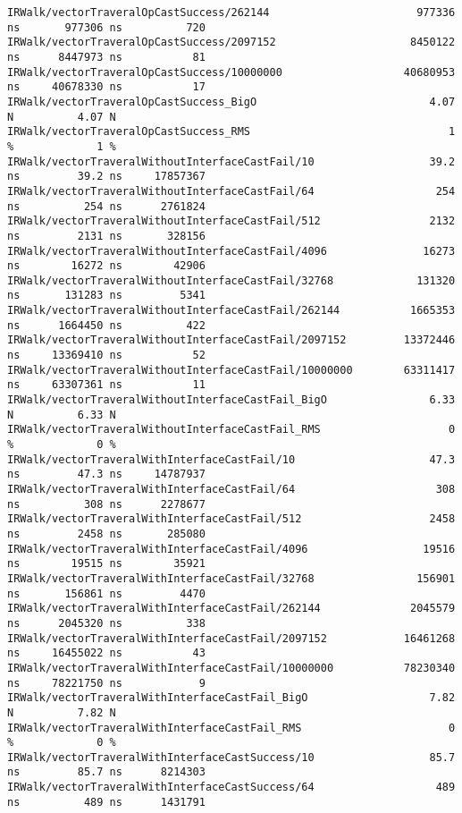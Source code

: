 \begin{code}
\begin{verbatim}
IRWalk/vectorTraveralOpCastSuccess/262144                       977336 ns       977306 ns          720
IRWalk/vectorTraveralOpCastSuccess/2097152                     8450122 ns      8447973 ns           81
IRWalk/vectorTraveralOpCastSuccess/10000000                   40680953 ns     40678330 ns           17
IRWalk/vectorTraveralOpCastSuccess_BigO                           4.07 N          4.07 N
IRWalk/vectorTraveralOpCastSuccess_RMS                               1 %             1 %
IRWalk/vectorTraveralWithoutInterfaceCastFail/10                  39.2 ns         39.2 ns     17857367
IRWalk/vectorTraveralWithoutInterfaceCastFail/64                   254 ns          254 ns      2761824
IRWalk/vectorTraveralWithoutInterfaceCastFail/512                 2132 ns         2131 ns       328156
IRWalk/vectorTraveralWithoutInterfaceCastFail/4096               16273 ns        16272 ns        42906
IRWalk/vectorTraveralWithoutInterfaceCastFail/32768             131320 ns       131283 ns         5341
IRWalk/vectorTraveralWithoutInterfaceCastFail/262144           1665353 ns      1664450 ns          422
IRWalk/vectorTraveralWithoutInterfaceCastFail/2097152         13372446 ns     13369410 ns           52
IRWalk/vectorTraveralWithoutInterfaceCastFail/10000000        63311417 ns     63307361 ns           11
IRWalk/vectorTraveralWithoutInterfaceCastFail_BigO                6.33 N          6.33 N
IRWalk/vectorTraveralWithoutInterfaceCastFail_RMS                    0 %             0 %
IRWalk/vectorTraveralWithInterfaceCastFail/10                     47.3 ns         47.3 ns     14787937
IRWalk/vectorTraveralWithInterfaceCastFail/64                      308 ns          308 ns      2278677
IRWalk/vectorTraveralWithInterfaceCastFail/512                    2458 ns         2458 ns       285080
IRWalk/vectorTraveralWithInterfaceCastFail/4096                  19516 ns        19515 ns        35921
IRWalk/vectorTraveralWithInterfaceCastFail/32768                156901 ns       156861 ns         4470
IRWalk/vectorTraveralWithInterfaceCastFail/262144              2045579 ns      2045320 ns          338
IRWalk/vectorTraveralWithInterfaceCastFail/2097152            16461268 ns     16455022 ns           43
IRWalk/vectorTraveralWithInterfaceCastFail/10000000           78230340 ns     78221750 ns            9
IRWalk/vectorTraveralWithInterfaceCastFail_BigO                   7.82 N          7.82 N
IRWalk/vectorTraveralWithInterfaceCastFail_RMS                       0 %             0 %
IRWalk/vectorTraveralWithInterfaceCastSuccess/10                  85.7 ns         85.7 ns      8214303
IRWalk/vectorTraveralWithInterfaceCastSuccess/64                   489 ns          489 ns      1431791

\end{verbatim}
\end{code}
